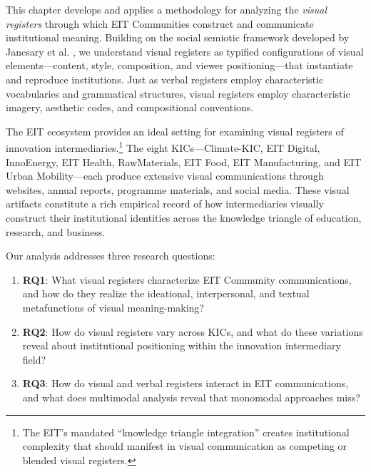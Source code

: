 \documentclass[../main.tex]{subfiles}
\begin{document}
This chapter develops and applies a methodology for analyzing the \textit{visual registers} through which EIT Communities construct and communicate institutional meaning. Building on the social semiotic framework developed by Jancsary et al. \cite{jancsary2018institutions}, we understand visual registers as typified configurations of visual elements---content, style, composition, and viewer positioning---that instantiate and reproduce institutions. Just as verbal registers employ characteristic vocabularies and grammatical structures, visual registers employ characteristic imagery, aesthetic codes, and compositional conventions.

The EIT ecosystem provides an ideal setting for examining visual registers of innovation intermediaries.\footnote{The EIT's mandated ``knowledge triangle integration'' creates institutional complexity that should manifest in visual communication as competing or blended visual registers.} The eight KICs---Climate-KIC, EIT Digital, InnoEnergy, EIT Health, RawMaterials, EIT Food, EIT Manufacturing, and EIT Urban Mobility---each produce extensive visual communications through websites, annual reports, programme materials, and social media. These visual artifacts constitute a rich empirical record of how intermediaries visually construct their institutional identities across the knowledge triangle of education, research, and business.

Our analysis addresses three research questions:

\begin{enumerate}
    \item \textbf{RQ1}: What visual registers characterize EIT Community communications, and how do they realize the ideational, interpersonal, and textual metafunctions of visual meaning-making?
    \item \textbf{RQ2}: How do visual registers vary across KICs, and what do these variations reveal about institutional positioning within the innovation intermediary field?
    \item \textbf{RQ3}: How do visual and verbal registers interact in EIT communications, and what does multimodal analysis reveal that monomodal approaches miss?
\end{enumerate}
\end{document}
